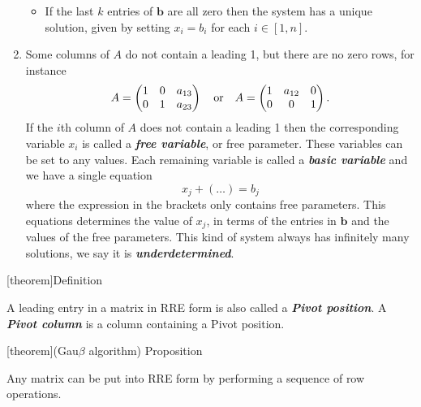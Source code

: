 \documentclass[12pt]{report}
\theoremstyle{definition}
\begin{document}
\begin{enumerate}[label = (\arabic*)]
\begin{itemize}
                \item If the last $k$ entries of $\pmb{b}$ are all zero then the system
                    has a unique solution, given by setting $x_i = b_i$ for each $i \in [1, n]$.
        \end{itemize}
        
    \item Some columns of $A$ do not contain a leading 1, but there are no zero rows, for instance\[
        A = \begin{pmatrix}
            1 & 0 & a_{13} \\
            0 & 1 & a_{23}
        \end{pmatrix} 
        \quad \textnormal{or} \quad
        A = \begin{pmatrix}
            1 & a_{12} & 0 \\
            0 & 0 & 1
        \end{pmatrix}.
    \]
    If the $i$th column of $A$ does not contain a leading 1 then the corresponding variable $x_i$
    is called a \textbf{\emph{free variable}}, or free parameter. These variables can be set to
    any values. Each remaining variable is called a \textbf{\emph{basic variable}} and 
    we have a single equation\[
        x_j + (\ldots) = b_j
    \]
    where the expression in the brackets only contains free parameters.
    This equations determines the value of $x_j$, in terms of the entries in $\pmb{b}$
    and the values of the free parameters.
    This kind of system always has infinitely many solutions, we say it is \textbf{\emph{underdetermined}}.
\end{enumerate}

[theorem]{Definition}
\begin{pivot position}
    A leading entry in a matrix in RRE form is also called a \textbf{\emph{Pivot position}}.
    A \textbf{\emph{Pivot column}} is a column containing a Pivot position.
\end{pivot position}

[theorem]{(Gau$\beta$ algorithm) Proposition}
\begin{Any matrix can convert to RRE}
    Any matrix can be put into RRE form by performing a sequence of row operations.
\end{Any matrix can convert to RRE}
\end{document}
